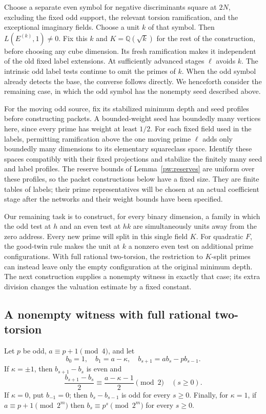 Choose a separate even symbol for negative discriminants square at $2N$,
excluding the fixed odd support, the relevant torsion ramification, and
the exceptional imaginary fields.  Choose a unit $k$ of that symbol.
Then $L(E^{(k)},1)\ne0$.  Fix this $k$ and
$K=\mathbb Q(\sqrt{k})$ for the rest of the construction, before choosing any
cube dimension.  Its fresh ramification makes it independent of the old
fixed label extensions.  At sufficiently advanced stages $\ell$ avoids
$k$.  The intrinsic odd label tests continue to omit the primes of $k$.
When the odd symbol already detects the base, the converse follows directly.
We henceforth consider the remaining case, in which the odd symbol has the
nonempty seed described above.

For the moving odd source, fix its stabilized minimum depth and seed
profiles before constructing packets. A bounded-weight seed has boundedly
many vertices here, since every prime has weight at least $1/2$. For each
fixed field used in the labels, permitting ramification above the one
moving prime $\ell$ adds only boundedly many dimensions to its elementary
squareclass space. Identify these spaces compatibly with their fixed
projections and stabilize the finitely many seed and label profiles.
The reserve bounds of Lemma~\ref{pw:reserves} are uniform over these
profiles, so the packet constructions below have a fixed size. They are
finite tables of labels; their prime representatives will be chosen at
an actual coefficient stage after the networks and their weight bounds
have been specified.

Our remaining task is to construct, for every binary dimension, a family
in which the odd test at $h$ and an even test at $hk$ are simultaneously
units away from the zero address. Every new prime will split in this
single field $K$. For quadratic $F$, the good-twin rule makes the unit
at $k$ a nonzero even test on additional prime configurations. With full
rational two-torsion, the restriction to $K$-split primes can instead
leave only the empty configuration at the original minimum depth. The
next construction supplies a nonempty witness in exactly that case;
its extra division changes the valuation estimate by a fixed constant.

\subsection{A nonempty witness with full rational two-torsion}
\label{pw:split-section}

\begin{lemma}\label{pw:recurrence}
Let $p$ be odd, $a\equiv p+1\pmod4$, and let
\[
 b_0=1,\quad b_1=a-\kappa,\quad
 b_{s+1}=ab_s-pb_{s-1}.
\]
If $\kappa=\pm1$, then $b_{s+1}-b_s$ is even and
\[
 \frac{b_{s+1}-b_s}{2}\equiv\frac{a-\kappa-1}{2}\pmod2
 \quad(s\ge0).
\]
If $\kappa=0$, put $b_{-1}=0$; then $b_s-b_{s-1}$ is odd for every
$s\ge0$.  Finally, for $\kappa=1$, if $a\equiv p+1\pmod{2^m}$ then
$b_s\equiv p^s\pmod{2^m}$ for every $s\ge0$.
\end{lemma}

